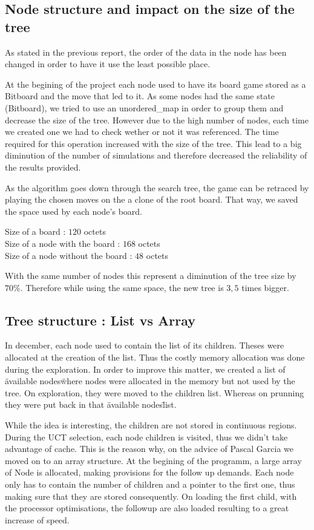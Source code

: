 \subsection{Node structure and impact on the size of the tree}

As stated in the previous report, the order of the data in the node has been changed in order to have it use the least possible place.

At the begining of the project each node used to have its board game stored as a Bitboard and the move that led to it. As some nodes had the same state (Bitboard), we tried to use an unordered\_map in order to group them and decrease the size of the tree. However due to the high number of nodes, each time we created one we had to check wether or not it was referenced. The time required for this operation increased with the size of the tree. This lead to a big diminution of the number of simulations and therefore decreased the reliability of the results provided.

As the algorithm goes down through the search tree, the game can be retraced by playing the chosen moves on the a clone of the root board. That way, we saved the space used by each node's board.

\noindent
Size of a board : $120$ octets\\
Size of a node with the board : $168$ octets\\
Size of a node without the board : $48$ octets

With the same number of nodes this represent a diminution of the tree size by $70\%$. Therefore while using the same space, the new tree is $3,5$ times bigger.

\subsection{Tree structure : List vs Array}

In december, each node used to contain the list of its children. Theses were allocated at the creation of the list. Thus the costly memory allocation was done during the exploration.
In order to improve this matter, we created a list of \"available nodes\" where nodes were allocated in the memory but not used by the tree. On exploration, they were moved to the children list. Whereas on prunning they were put back in that \"available nodes\" list.

While the idea is interesting, the children are not stored in continuous regions. During the UCT selection, each node children is visited, thus we didn't take advantage of cache. This is the reason why, on the advice of Pascal Garcia we moved on to an array structure. At the begining of the programm, a large array of Node is allocated, making provisions for the follow up demands. Each node only has to contain the number of children and a pointer to the first one, thus making sure that they are stored consequently. On loading the first child, with the processor optimisations, the followup are also loaded resulting to a great increase of speed.

